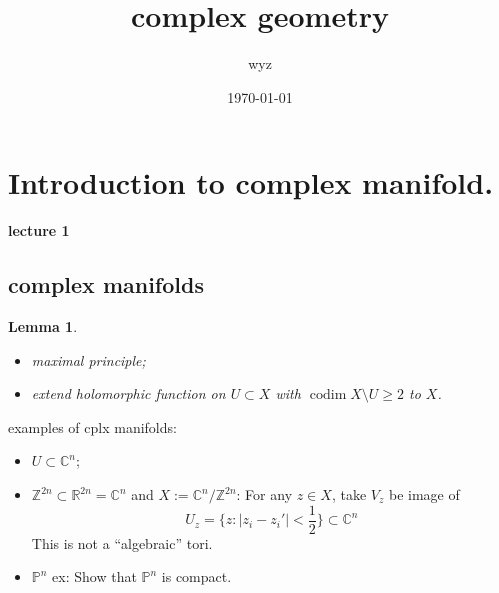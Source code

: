 \documentclass{article}
\title{complex geometry}
\author{wyz}
\date{\today}
\newtheorem{lemma}[definition]{Lemma}
\begin{document}
\maketitle
\section{Introduction to complex manifold.}

\textbf{lecture 1}
\subsection{complex manifolds}
\begin{lemma}
  \begin{itemize}
    \item maximal principle;
    \item extend holomorphic function on $U \subset X$ with $ \operatorname{codim}X \setminus U \geqslant  2$ to $X$.
  \end{itemize}
\end{lemma}
examples of cplx manifolds: 
\begin{itemize}
  \item $U \subset \mathbb{C}^{n}$;
  \item $\mathbb{Z}^{2n} \subset \mathbb{R}^{2n}=\mathbb{C}^{n}$ and $X:= \mathbb{C}^{n}/\mathbb{Z}^{2n}$:
    For any $z\in X$, take $V_{z}$ be image of
    \[
     U_{z}= \{z: |z_{i}-z_{i}'|< \frac{1}{2} \} \subset \mathbb{C}^{n}
    \]
   This is not a ``algebraic'' tori. 
 \item $\mathbb{P}^{n}$
   ex: Show that $\mathbb{P}^{n}$ is compact.
\end{itemize}
\end{document}
